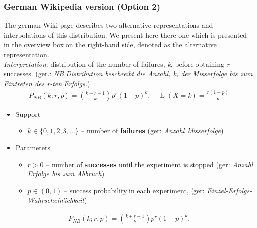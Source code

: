 \subsubsection*{German Wikipedia version (Option 2)}
The german Wiki page describes two alternative representations and interpolations
of this distribution. We present here there one which is presented in the overview 
box on the right-hand side, denoted as the alternative representation.\\
\textit{Interpretation}: distribution of the number of failures, \emph{k}, before obtaining \emph{r} successes. 
(ger.: \emph{NB Distribution beschreibt die Anzahl, k, der Misserfolge bis zum Eintreten des r-ten Erfolgs.})
\begin{align*}
P_{N\!B}(k;r,p) = {k + r - 1 \choose k} p^r (1-p)^k, \quad \operatorname E(X\!=\!k)=\frac{r(1-p)}{p}
\end{align*}
\begin{itemize}
\item 
Support
\begin{itemize}
\item 
$k \in \{ 0, 1, 2, 3, \dots\}$ -- number of \textbf{failures} (ger: \emph{Anzahl Misserfolge})
\end{itemize}
\item 
Parameters 
\begin{itemize}
\item 
$r > 0$ -- number of \textbf{successes} until the experiment is stopped (ger: \emph{Anzahl Erfolge bis zum Abbruch})
\item 
$p \in (0,1)$ -- success probability in each experiment, (ger: \emph{Einzel-Erfolgs-Wahrscheinlichkeit})
\end{itemize}
\end{itemize}
\begin{align*}
P_{N\!B}(k;r,p) = {k + r - 1 \choose k} p^r (1-p)^k  .
\end{align*}

